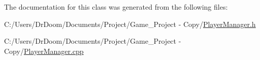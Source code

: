 The documentation for this class was generated from the following files\+:\begin{DoxyCompactItemize}
\item 
C\+:/\+Users/\+Dr\+Doom/\+Documents/\+Project/\+Game\+\_\+\+Project -\/ Copy/\hyperlink{_player_manager_8h}{Player\+Manager.\+h}\item 
C\+:/\+Users/\+Dr\+Doom/\+Documents/\+Project/\+Game\+\_\+\+Project -\/ Copy/\hyperlink{_player_manager_8cpp}{Player\+Manager.\+cpp}\end{DoxyCompactItemize}
